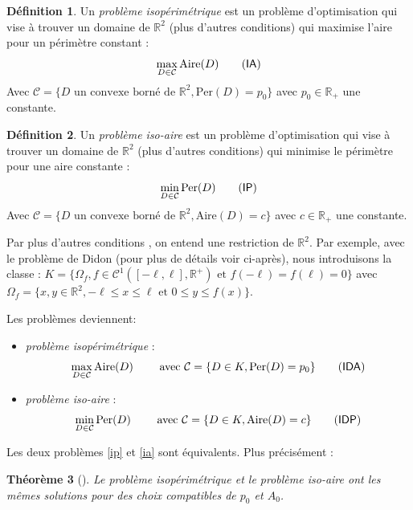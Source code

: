 \documentclass[10pt,a4paper]{article}
\newcommand{\R}{\mathbb{R}}
\newcommand{\C}{\mathcal{C}}
\newcommand{\A}{\mathrm{Aire}}
\newcommand{\p}{\mathrm{Per}}
\newcommand{\IA}{\textsf{IA}}
\newcommand{\IP}{\textsf{IP}}
\newcommand{\IDA}{\textsf{IDA}}
\newcommand{\IDP}{\textsf{IDP}}
\renewcommand{\ss}{\vspace*{\baselineskip}}
\theoremstyle{plain}
\newtheorem{thm}{Théorème}[section]
\theoremstyle{definition}
\newtheorem{defi}[thm]{Définition}
\begin{document}
\begin{defi}
Un \emph{problème isopérimétrique} est un problème d'optimisation qui vise à trouver un domaine de $\R^2$ (plus d'autres conditions) qui maximise l'aire pour un périmètre constant :
\[\max_{D \in \C} \A(D) \label{ia}\tag{\IA}\]
Avec $\mathcal{C} = \{ D \text{ un convexe borné de } \R^2, \p(D) = p_0 \}$ avec $p_0\in \R_+$ une constante.


\end{defi}

\begin{defi}
Un \emph{problème iso-aire} est un problème d'optimisation qui vise à trouver un domaine de $\R^2$ (plus d'autres conditions) qui minimise le périmètre pour une aire constante :
\[\min_{D \in \C} \p(D) \label{ip}\tag{\IP}\]
Avec $\mathcal{C} = \{ D \text{ un convexe borné de } \R^2, \A(D)=c \}$ avec $c \in \R_+$ une constante.
\end{defi}


Par \og plus d'autres conditions \fg{}, on entend une restriction de $\R^2$. Par exemple, avec le problème de Didon (pour plus de détails voir ci-après), nous introduisons la classe : $K = \{ \Omega_f, f \in \C^1([-\ell,\ell],\R^+) \text{ et } f(-\ell) = f(\ell) = 0 \}$ avec $\Omega_f = \{ x, y \in \R^2, -\ell \leq x \leq \ell \text{ et } 0 \leq y \leq f(x) \}$.

Les problèmes deviennent:
\begin{itemize}
    \item \emph{problème isopérimétrique} : \[\max_{D \in \C} \A(D) \qquad\text{ avec } \C = \{ D \in K, \p(D) = p_0 \} \label{ida}\tag{\IDA}\]
    \item \emph{problème iso-aire} : \[\min_{D \in \C} \p(D) \qquad\text{ avec } \C = \{ D \in K, \A(D)=c \} \label{idp}\tag{\IDP}\]
\end{itemize}

\ss
Les deux problèmes \ref{ip} et \ref{ia} sont équivalents. Plus précisément :

\begin{thm}[\cite{tapia09}]
Le problème isopérimétrique et le problème iso-aire ont les mêmes solutions pour des choix compatibles de $p_0$ et $A_0$.
\end{thm}
\end{document}
